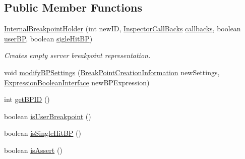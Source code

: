 \subsection*{Public Member Functions}
\begin{DoxyCompactItemize}
\item 
\hyperlink{classgov_1_1nasa_1_1jpf_1_1inspector_1_1server_1_1breakpoints_1_1_internal_breakpoint_holder_a11b0c61b5b9f16a20e7cf4973ea3dae4}{Internal\+Breakpoint\+Holder} (int new\+ID, \hyperlink{interfacegov_1_1nasa_1_1jpf_1_1inspector_1_1interfaces_1_1_inspector_call_backs}{Inspector\+Call\+Backs} \hyperlink{classgov_1_1nasa_1_1jpf_1_1inspector_1_1server_1_1breakpoints_1_1_internal_breakpoint_holder_aa5c3ad78995fd032dbbb96d53b8b3839}{callbacks}, boolean \hyperlink{classgov_1_1nasa_1_1jpf_1_1inspector_1_1server_1_1breakpoints_1_1_internal_breakpoint_holder_a3e610f11675553b389c51a824b68a69d}{user\+BP}, boolean \hyperlink{classgov_1_1nasa_1_1jpf_1_1inspector_1_1server_1_1breakpoints_1_1_internal_breakpoint_holder_aa0cfc4131f194e774b1dcf635a954c32}{sigle\+Hit\+BP})
\begin{DoxyCompactList}\small\item\em Creates empty server breakpoint representation. \end{DoxyCompactList}\item 
void \hyperlink{classgov_1_1nasa_1_1jpf_1_1inspector_1_1server_1_1breakpoints_1_1_internal_breakpoint_holder_a26794cbe7ef91299794c6a87dc1f3fe7}{modify\+B\+P\+Settings} (\hyperlink{interfacegov_1_1nasa_1_1jpf_1_1inspector_1_1interfaces_1_1_break_point_creation_information}{Break\+Point\+Creation\+Information} new\+Settings, \hyperlink{interfacegov_1_1nasa_1_1jpf_1_1inspector_1_1server_1_1expression_1_1_expression_boolean_interface}{Expression\+Boolean\+Interface} new\+B\+P\+Expression)
\item 
int \hyperlink{classgov_1_1nasa_1_1jpf_1_1inspector_1_1server_1_1breakpoints_1_1_internal_breakpoint_holder_a8248867d24ba8b191bda1a68b8df3d82}{get\+B\+P\+ID} ()
\item 
boolean \hyperlink{classgov_1_1nasa_1_1jpf_1_1inspector_1_1server_1_1breakpoints_1_1_internal_breakpoint_holder_a31cb0111774566987e4579247dfe67a1}{is\+User\+Breakpoint} ()
\item 
boolean \hyperlink{classgov_1_1nasa_1_1jpf_1_1inspector_1_1server_1_1breakpoints_1_1_internal_breakpoint_holder_a81e881abeb48f7b348aefe36d39a5e71}{is\+Single\+Hit\+BP} ()
\item 
boolean \hyperlink{classgov_1_1nasa_1_1jpf_1_1inspector_1_1server_1_1breakpoints_1_1_internal_breakpoint_holder_a3964bb70cc4c84fc35f5e2bd82d7b82c}{is\+Assert} ()

\end{DoxyCompactItemize}
